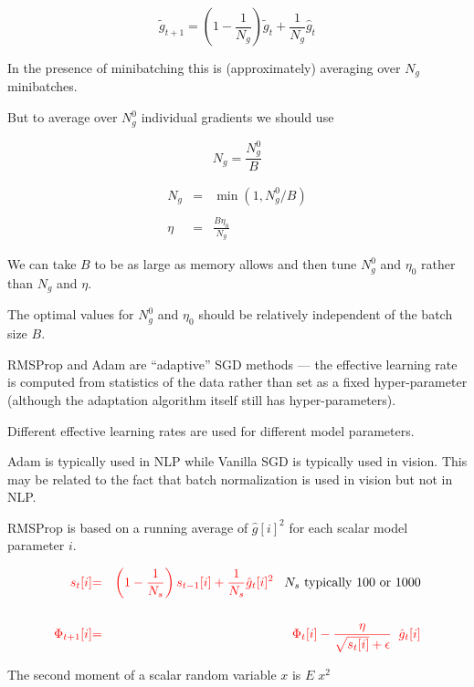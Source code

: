 {$$\tilde{g}_{t+1} = \left(1-\frac{1}{N_g}\right)\tilde{g}_t + \frac{1}{N_g}\hat{g}_t$$

In the presence of minibatching this is (approximately) averaging over $N_g$ minibatches.

\vfill
But to average over $N^0_g$ individual gradients we should use

{\color{red} $$N_g = \frac{N^0_g}{B}$$}


\begin{eqnarray*}
N_g & = & \min\left(1,N^0_g/B\right) \\
\\
\eta & = & \frac{B\eta_0}{N_g}
\end{eqnarray*}

We can take $B$ to be as large as memory allows and then tune $N^0_g$ and $\eta_0$ rather than $N_g$ and $\eta$.

\vfill
The optimal values for $N^0_g$ and $\eta_0$ should be relatively independent of the batch size $B$.


RMSProp and Adam are ``adaptive'' SGD methods --- the effective learning rate is computed from statistics of the data rather than set as a fixed hyper-parameter (although
the adaptation algorithm itself still has hyper-parameters).

\vfill
Different effective learning rates are used for different model parameters.

\vfill
Adam is typically used in NLP while Vanilla SGD is typically used in vision.  This may be related to the fact that batch normalization is used in vision but not in NLP.


RMSProp is based on a running average of $\hat{g}[i]^2$ for each scalar model parameter $i$.

\begin{eqnarray*}
{\color{red} s_t[i]} & {\color{red} =} & {\color{red} \left(1-\frac{1}{N_s}\right) s_{t-1}[i] + \frac{1}{N_s} \hat{g}_t[i]^2}\;\;\;\mbox{$N_s$ typically 100 or 1000} \\
\\
{\color{red} \Phi_{t+1}[i]} & {\color{red} =} & {\color{red} \Phi_t[i] - \frac{\eta}{\sqrt{s_t[i]} + \epsilon}\;\; \hat{g}_t[i]}
\end{eqnarray*}

The second moment of a scalar random variable $x$ is $E\;x^2$

}
